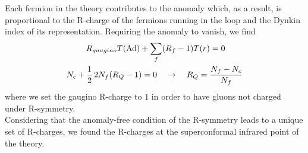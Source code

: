 Each fermion in the theory contributes to the anomaly which, as a result, is proportional to the R-charge of the fermions running in the loop and the Dynkin index of its representation.
Requiring the anomaly to vanish, we find
\begin{align}
R_{gaugino} T (\hbox{Ad}) + \sum_{ f} (& R_{f} - 1)  T(r)   = 0 
\label{eqn:r_symm_anom_condition}
\\
N_c + \frac{1}{2}\,  2 N_f (R_Q -1)  = 0 \quad & \rightarrow \quad R_Q = \frac{N_f - N_c}{N_f}
\end{align}
where we set the gaugino R-charge to $1$ in order to have gluons not charged under R-symmetry.
\\
Considering that the anomaly-free condition of the R-symmetry leads to a unique set of R-charges, we found the R-charges at the superconformal infrared point of the theory.


